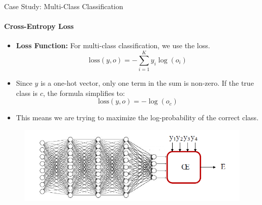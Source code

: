 \begin{frame}{Case Study: Multi-Class Classification}
    \framesubtitle{Cross-Entropy Loss}
    \begin{itemize}
        \item \textbf{Loss Function:} For multi-class classification, we use the  loss.
        \[
            \text{loss}(y, o) = -\sum_{i=1}^{K} y_i \log(o_i)
        \]
        \item Since $y$ is a one-hot vector, only one term in the sum is non-zero. If the true class is $c$, the formula simplifies to:
        \[
            \text{loss}(y, o) = - \log(o_c)
        \]
        \item This means we are trying to maximize the log-probability of the correct class.
    \end{itemize}
    \begin{figure}
        \centering
        \includegraphics[width=0.8\linewidth]{images/loss_multiclass_ce.png}
    \end{figure}
\end{frame}
